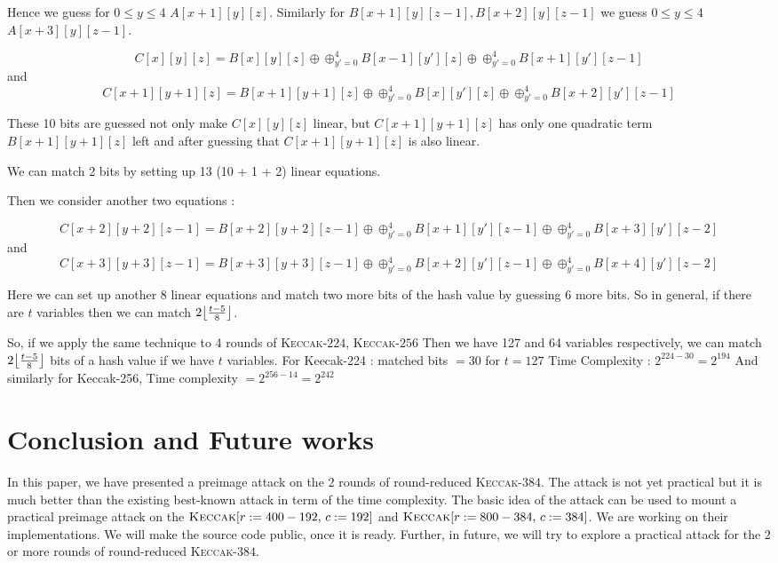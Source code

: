 \documentclass[runningheads]{llncs}
\DeclarePairedDelimiter\floor{\lfloor}{\rfloor}
\newcommand{\KECCAK}{\mbox{\textsc{Keccak}}}
\newcommand{\Keccak}{\mbox{\textsc{Keccak}}}
\begin{document}
	Hence we guess for $0 \leq y \leq 4$ $A[x+1][y][z]$. Similarly for $B[x+1][y][z-1], B[x+2][y][z-1]$ we guess $0 \leq y \leq 4$ $A[x+3][y][z-1]$. 
	
		\[
        C[x][y][z] = B[x][y][z] \oplus \oplus_{y' = 0}^{4} B[x-1][y'][z] \oplus \oplus_{y' = 0}^{4} B[x+1][y'][z-1]
    \] and 
		\[
        C[x+1][y+1][z] = B[x+1][y+1][z] \oplus \oplus_{y' = 0}^{4} B[x][y'][z] \oplus \oplus_{y' = 0}^{4} B[x+2][y'][z-1]
    \]

    These 10 bits are guessed not only make $C[x][y][z]$ linear, but $C[x+1][y+1][z]$ has only one quadratic term $B[x+1][y+1][z]$ left and after guessing that $C[x+1][y+1][z]$ is also linear. 
    
    We can match 2 bits by setting up 13 (10 + 1 + 2) linear equations. 
    
    Then we consider another two equations :
    
    	\[
        C[x + 2][y+2][z-1] = B[x + 2][y+2][z-1] \oplus \oplus_{y' = 0}^{4} B[x+1][y'][z-1] \oplus \oplus_{y' = 0}^{4} B[x+3][y'][z-2]
    \] and 
		\[
        C[x+3][y+3][z-1] = B[x+3][y+3][z-1] \oplus \oplus_{y' = 0}^{4} B[x+2][y'][z-1] \oplus \oplus_{y' = 0}^{4} B[x+4][y'][z-2]
    \]
    
    Here we can set up another 8 linear equations and match two more bits of the hash value by guessing 6 more bits. So in general, if there are $t$ variables then we can match $2\floor*{\frac{t-5}{8}}$.
    
    So, if we apply the same technique to 4 rounds of \KECCAK-$224$, \KECCAK-$256$
    Then we have 127 and 64 variables respectively, we can match $2\floor*{\frac{t-5}{8}}$ bits of a hash value if we have $t$ variables.
    For Keecak-224 : matched bits $= 30$ for $t = 127$
    Time Complexity : $2^{224 - 30} = 2^{194}$
    And similarly for Keccak-256, Time complexity $=2^{256 - 14} = 2^{242}$

\section{Conclusion and Future works}
In this paper, we have presented a preimage attack on the $2$ rounds of round-reduced \KECCAK-$384$. The attack is not yet practical but it is much better than the existing best-known attack in term of the time complexity. The basic idea of the attack can be used to mount a practical preimage attack on the $\Keccak[r:=400-192,\, c:=192]$ and $\Keccak[r:=800-384,\,c:=384]$. 
We are working on their implementations. We will make the source code public, once it is ready. 
Further, in future, we will try to explore a practical attack for the $2$ or more rounds of round-reduced \KECCAK-$384$.
\end{document}
